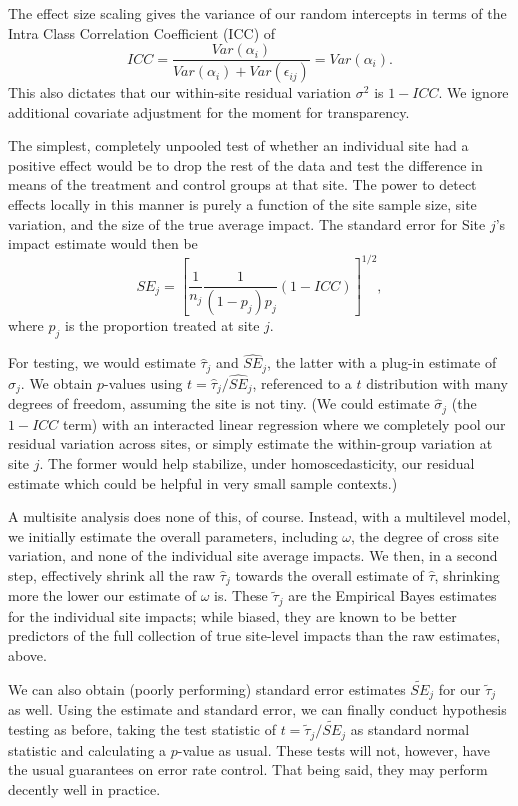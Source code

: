 \documentclass[]{article}
\begin{document}
The effect size scaling gives the variance of our random intercepts in terms of the Intra Class Correlation Coefficient (ICC) of
$$ ICC = \frac{Var(\alpha_i)}{Var(\alpha_i) + Var(\epsilon_{ij})} = Var(\alpha_i) .$$
This also dictates that our within-site residual variation $\sigma^2$ is $1-ICC$.
We ignore additional covariate adjustment for the moment for transparency.

The simplest, completely unpooled test of whether an individual site had a positive effect would be to drop the rest of the data and test the difference in means of the treatment and control groups at that site.
The power to detect effects locally in this manner is purely a function of the site sample size, site variation, and the size of the true average impact.
The standard error for Site $j$'s impact estimate would then be
$$ SE_j = \left[ \frac{1}{n_j} \frac{1}{(1-p_j)p_j} (1-ICC) \right]^{1/2} , $$ 
where $p_j$ is the proportion treated at site $j$.

For testing, we would estimate $\hat{\tau}_j$ and $\widehat{SE}_j$, the latter with a plug-in estimate of $\hat{\sigma}_j$.
We obtain $p$-values using $t = \hat{\tau}_j / \widehat{SE}_j$, referenced to a $t$ distribution with many degrees of freedom, assuming the site is not tiny.
(We could estimate $\hat{\sigma}_j$ (the $1 - ICC$ term) with an interacted linear regression where we completely pool our residual variation across sites, or simply estimate the within-group variation at site $j$. The former would help stabilize, under homoscedasticity, our residual estimate which could be helpful in very small sample contexts.)

A multisite analysis does none of this, of course.
Instead, with a multilevel model, we initially estimate the overall parameters, including $\omega$, the degree of cross site variation, and none of the individual site average impacts.
We then, in a second step, effectively shrink all the raw $\hat{\tau}_j$ towards the overall estimate of $\hat{\tau}$, shrinking more the lower our estimate of $\omega$ is.
These $\tilde{\tau}_j$ are the Empirical Bayes estimates for the individual site impacts; while biased, they are known to be better predictors of the full collection of true site-level impacts than the raw estimates, above.

We can also obtain (poorly performing) standard error estimates $\tilde{SE}_j$ for our $\tilde{\tau}_j$ as well.
Using the estimate and standard error, we can finally conduct hypothesis testing as before, taking the test statistic of $t = \tilde{\tau}_j / \tilde{SE}_j$ as standard normal statistic and calculating a $p$-value as usual.
These tests will not, however, have the usual guarantees on error rate control.
That being said, they may perform decently well in practice.
\end{document}
